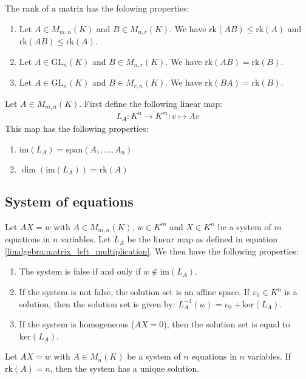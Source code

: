 	\begin{property}\label{linalgebra:rank_properties}
	        The rank of a matrix has the folowing properties:
        	\begin{enumerate}
			\item Let $A\in M_{m,n}(K)$ and $B\in M_{n,r}(K)$. We have $\text{rk}(AB)\leq\text{rk}(A)$ and $\text{rk}(AB)\leq\text{rk}(A)$.
        		\item Let $A\in\text{GL}_n(K)$ and $B\in M_{n,r}(K)$. We have $\text{rk}(AB)=\text{rk}(B)$.
		        \item Let $A\in\text{GL}_n(K)$ and $B\in M_{r,n}(K)$. We have $\text{rk}(BA)=\text{rk}(B)$.
		\end{enumerate}
	\end{property}
	\begin{property}\label{linalgebra:dim_matrix_left_multiplication}
	        Let $A\in M_{m,n}(K)$. First define the following linear map:
        	\begin{gather}
			\label{linalgebra:matrix_left_multiplication}
        		\boxed{L_A:K^n\rightarrow K^m:v\mapsto Av}
		\end{gather}
	        This map has the following properties:
        	\begin{enumerate}
        		\item $\text{im}(L_A) = \text{span}(A_1, ..., A_n)$
			\item $\dim(\text{im}(L_A))=\text{rk}(A)$
		\end{enumerate}
	\end{property}
    
\subsection{System of equations}

	\begin{theorem}\label{linalgebra:matrix_and_equations}
	        Let $AX=w$ with $A\in M_{m,n}(K)$, $w\in K^m$ and $X\in K^n$ be a system of $m$ equations in $n$ variables. Let $L_A$ be the linear map as defined in equation \ref{linalgebra:matrix_left_multiplication}. We then have the following properties:
        	\begin{enumerate}
			\item The system is false if and only if $w\not\in\text{im}(L_A)$.
        		\item If the system is not false, the solution set is an affine space. If $v_0\in K^n$ is a solution, then the solution set is given by: $L_A^{-1}(w)=v_0+\text{ker}(L_A)$.
		        \item If the system is homogeneous ($AX=0$), then the solution set is equal to $\text{ker}(L_A)$.
		\end{enumerate}
	\end{theorem}
	\begin{theorem}[Uniqueness]\label{linalgebra:rank_unique_solution}
	        Let $AX=w$ with $A\in M_n(K)$ be a system of $n$ equations in $n$ variables. If $\text{rk}(A)=n$, then the system has a unique solution.
	\end{theorem}
    
